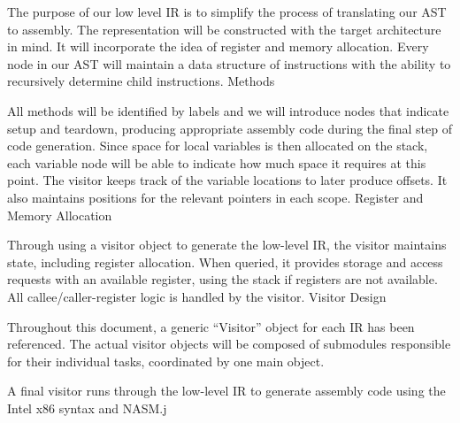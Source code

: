 \documentclass[12pt]{article}
\begin{document}
The purpose of our low level IR is to simplify the process of translating our AST to assembly. The
representation will be constructed with the target architecture in mind. It will incorporate the
idea of register and memory allocation. Every node in our AST will maintain a data structure of
instructions with the ability to recursively determine child instructions.
Methods

All methods will be identified by labels and we will introduce nodes that indicate setup and
teardown, producing appropriate assembly code during the final step of code generation. Since space
for local variables is then allocated on the stack, each variable node will be able to indicate how
much space it requires at this point. The visitor keeps track of the variable locations to later
produce offsets. It also maintains positions for the relevant pointers in each scope.
Register and Memory Allocation

Through using a visitor object to generate the low-level IR, the visitor maintains state, including
register allocation. When queried, it provides storage and access requests with an available
register, using the stack if registers are not available. All callee/caller-register logic is
handled by the visitor.
Visitor Design

Throughout this document, a generic “Visitor” object for each IR has been referenced. The actual
visitor objects will be composed of submodules responsible for their individual tasks, coordinated
by one main object.

A final visitor runs through the low-level IR to generate assembly code using the Intel x86 syntax
and NASM.j
\end{document}
